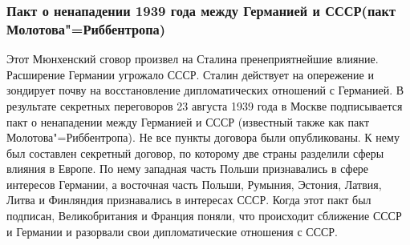 \subsubsection{\textbf{Пакт о ненападении 1939 года между Германией и СССР(пакт Молотова"=Риббентропа)}}

Этот Мюнхенский сговор произвел на Сталина пренеприятнейшие влияние. Расширение Германии угрожало СССР. Сталин действует на опережение и зондирует почву на восстановление дипломатических отношений с Германией. В результате секретных переговоров 23 августа 1939 года в Москве подписывается пакт о ненападении между Германией и СССР (известный также как пакт Молотова"=Риббентропа). Не все пункты договора были опубликованы. К нему был составлен секретный договор, по которому две страны разделили сферы влияния в Европе. По нему западная часть Польши признавались в сфере интересов Германии, а восточная часть Польши, Румыния, Эстония, Латвия, Литва и Финляндия признавались в интересах СССР. Когда этот пакт был подписан, Великобритания и Франция поняли, что происходит сближение СССР и Германии и разорвали свои дипломатические отношения с СССР.

